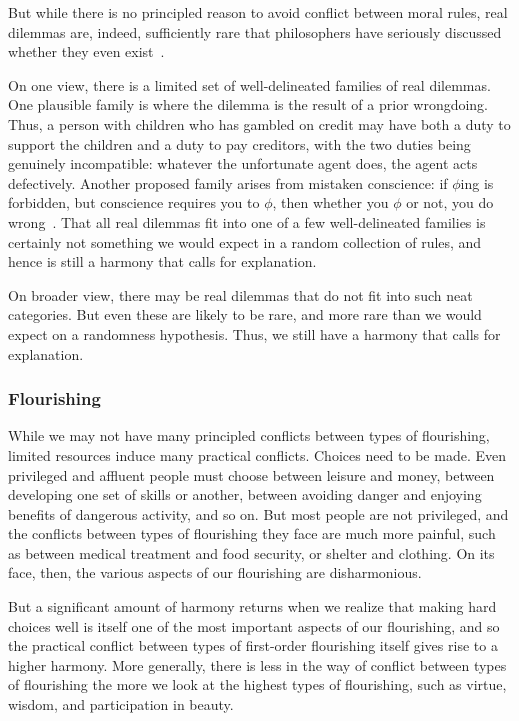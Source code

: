 But while there is no principled reason to avoid conflict between moral rules, real dilemmas are, indeed, sufficiently
rare that philosophers have seriously discussed whether they even exist~\parencite{ConeeDilemmas,Zimmerman1996}. 

On one view, there is a limited set of well-delineated families of real dilemmas. One plausible family is where the 
dilemma is the result of a prior wrongdoing. Thus, a person with children who has gambled on credit may have both a duty 
to support the children and a duty to pay creditors, with the two duties being genuinely incompatible: whatever the 
unfortunate agent does, the agent acts defectively. Another proposed family arises from mistaken conscience:
if $\phi$ing is forbidden, but conscience requires you to $\phi$, then whether you $\phi$ or not, you do wrong~\parencite{MurphyConscience}.
That all real dilemmas fit into one of a few well-delineated families is certainly not something we would expect 
in a random collection of rules, and hence is still a harmony that calls for explanation.

On broader view, there may be real dilemmas that do not fit into such neat categories. But even these are likely to be 
rare, and more rare than we would expect on a randomness hypothesis. Thus, we still have a harmony that calls for
explanation.

\subsubsection{Flourishing}
While we may not have many principled conflicts between types of flourishing, limited resources induce many 
practical conflicts. Choices need to be made.
Even privileged and affluent people must choose between leisure and money, between developing one set of skills or another, 
between avoiding danger and enjoying benefits of dangerous activity, and so on. But most people are not privileged,
and the conflicts between types of flourishing they face are much more painful, such as between medical treatment and food security, or shelter and clothing. On its face, then, the various aspects of our flourishing are disharmonious. 

But a significant amount of harmony returns when we realize that making hard choices well is itself one of the most 
important aspects of our flourishing, and so the practical conflict between types of first-order flourishing itself gives rise
to a higher harmony. More generally, there is less in the way of conflict between types of flourishing the more we look 
at the highest types of flourishing, such as virtue, wisdom, and participation in beauty. 


